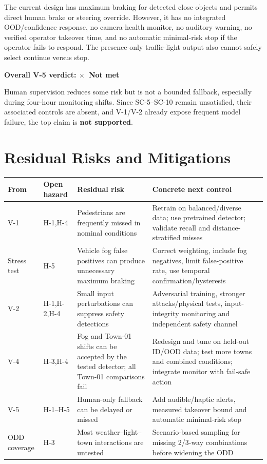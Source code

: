 \documentclass[nologo,a4paper,12pt]{article}
\makeatletter
\newcommand{\verdictnotmet}{\textbf{\color{mls@red}$\times$~Not met}}
\makeatother
\begin{document}
\begin{mdframed}[style=evidencestyle]
The current design has maximum braking for detected close objects and permits direct human brake
or steering override. However, it has no integrated OOD/confidence response, no camera-health
monitor, no auditory warning, no verified operator takeover time, and no automatic minimal-risk
stop if the operator fails to respond. The presence-only traffic-light output also cannot safely
select continue versus stop.

\medskip
\textbf{Overall V-5 verdict: \verdictnotmet}
\end{mdframed}

Human supervision reduces some risk but is not a bounded fallback, especially during four-hour
monitoring shifts. Since SC-5--SC-10 remain unsatisfied, their associated controls are absent,
and V-1/V-2 already expose frequent model failure, the top claim is \textbf{not supported}.

\clearpage
\section{Residual Risks and Mitigations}
\label{sec:residual}

{\small
\begin{tabularx}{\linewidth}{@{}p{1.0cm}p{1.4cm}YY@{}}
\toprule
\textbf{From} & \textbf{Open hazard} & \textbf{Residual risk} & \textbf{Concrete next control} \\
\midrule
V-1 & H-1,H-4 & Pedestrians are frequently missed in nominal conditions & Retrain on balanced/diverse data; use pretrained detector; validate recall and distance-stratified misses \\
Stress test & H-5 & Vehicle fog false positives can produce unnecessary maximum braking & Correct weighting, include fog negatives, limit false-positive rate, use temporal confirmation/hysteresis \\
V-2 & H-1,H-2,H-4 & Small input perturbations can suppress safety detections & Adversarial training, stronger attacks/physical tests, input-integrity monitoring and independent safety channel \\
V-4 & H-3,H-4 & Fog and Town-01 shifts can be accepted by the tested detector; all Town-01 comparisons fail & Redesign and tune on held-out ID/OOD data; test more towns and combined conditions; integrate monitor with fail-safe action \\
V-5 & H-1--H-5 & Human-only fallback can be delayed or missed & Add audible/haptic alerts, measured takeover bound and automatic minimal-risk stop \\
ODD coverage & H-3 & Most weather--light--town interactions are untested & Scenario-based sampling for missing 2/3-way combinations before widening the ODD \\
\bottomrule
\end{tabularx}}
\end{document}
